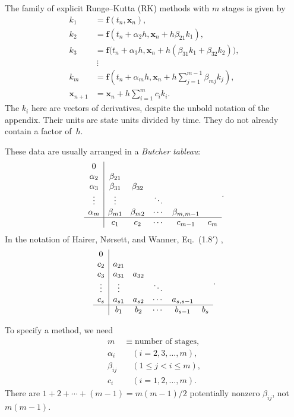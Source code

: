 The family of explicit Runge--Kutta (RK) methods with $m$ stages is given by
\begin{equation}\label{Eq:ERKmethodsMthStage}
\begin{aligned}
 k_1&=\mathbf f(t_n,\mathbf x_n),\\
 k_2&=\mathbf f(t_n+\alpha_2h,\mathbf x_n+h\beta_{21}k_1),\\
 k_3&=\mathbf f\bigl(t_n+\alpha_3h,
             \mathbf x_n+h(\beta_{31}k_1+\beta_{32}k_2)\bigr),\\
 &\ \vdots\\
 k_m&=\mathbf f\left(t_n+\alpha_mh,
                  \mathbf x_n+h\sum_{j=1}^{m-1}\beta_{mj}k_j\right),\\
 \mathbf x_{n+1}&=\mathbf x_n+h\sum_{i=1}^m c_i k_i.
\end{aligned}
\end{equation}
The $k_i$ here are vectors of derivatives, despite the unbold notation of
the appendix. Their units are state units divided by time. They do not
already contain a factor of~$h$.

These data are usually arranged in a \emph{Butcher tableau}:
\begin{equation}\label{Eq:RKAppendixTableau}
\begin{array}{c|ccccc}
 0&&&&&\\
 \alpha_2&\beta_{21}&&&&\\
 \alpha_3&\beta_{31}&\beta_{32}&&&\\
 \vdots&\vdots&&\ddots&&\\
 \alpha_m&\beta_{m1}&\beta_{m2}&\cdots&\beta_{m,m-1}&\\ \hline
 &c_1&c_2&\cdots&c_{m-1}&c_m
\end{array}.
\end{equation}
In the notation of Hairer, N\o rsett, and Wanner, Eq.~(1.8$'$)
\cite[Section~II.1]{HNW1993},
\begin{equation}\label{Eq:RKHNWTableau}
\begin{array}{c|ccccc}
 0&&&&&\\
 c_2&a_{21}&&&&\\
 c_3&a_{31}&a_{32}&&&\\
 \vdots&\vdots&&\ddots&&\\
 c_s&a_{s1}&a_{s2}&\cdots&a_{s,s-1}&\\ \hline
 &b_1&b_2&\cdots&b_{s-1}&b_s
\end{array}.
\end{equation}

To specify a method, we need
\[
\begin{aligned}
 m&\equiv\text{number of stages},\\
 \alpha_i&\quad(i=2,3,\dots,m),\\
 \beta_{ij}&\quad(1\leq j<i\leq m),\\
 c_i&\quad(i=1,2,\dots,m).
\end{aligned}
\]
There are $1+2+\cdots+(m-1)=m(m-1)/2$ potentially nonzero
$\beta_{ij}$, not $m(m-1)$.

